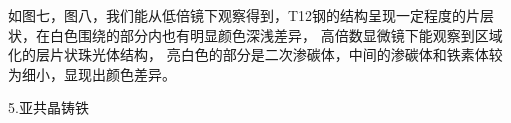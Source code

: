 \documentclass[a4paper,utf8]{article}
\begin{document}
如图七，图八，我们能从低倍镜下观察得到，T12钢的结构呈现一定程度的片层状，在白色围绕的部分内也有明显颜色深浅差异，
高倍数显微镜下能观察到区域化的层片状珠光体结构， 亮白色的部分是二次渗碳体，中间的渗碳体和铁素体较为细小，显现出颜色差异。
\begin{figure}[!ht]
    \begin{floatrow}
    \end{floatrow}

\end{figure}

\newpage
5.亚共晶铸铁
\end{document}
